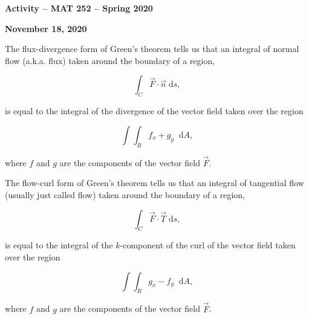 \documentclass{amsart}
\newcommand{\dA}{\;\mbox{d}A}
\begin{document}
\thispagestyle{empty}

\centerline{\Large \bf Activity -- MAT 252 -- Spring 2020}
\bigskip
\centerline{\large \bf November 18, 2020}

\Large


The flux-divergence form of Green's theorem tells us that an integral of 
normal flow (a.k.a. flux) taken around the boundary
of a region,

\[ \int_C \vec{F} \cdot \vec{n} \; \mbox{d}s, \]

is equal to the integral of the divergence of the vector field taken 
over the region

\[ \int\int_R f_x + g_y  \; \dA , \]

\noindent where $f$ and $g$ are the components of the vector field $\vec{F}$.

\vfill

The flow-curl form of Green's theorem tells us that an integral of 
tangential flow (usually just called flow) taken around the boundary
of a region,

\[ \int_C \vec{F} \cdot \vec{T} \; \mbox{d}s, \]

is equal to the integral of the $k$-component of the curl of the vector field taken 
over the region

\[ \int\int_R g_x - f_y  \; \dA , \]

\noindent where $f$ and $g$ are the components of the vector field $\vec{F}$.

\vfill

\newpage
\end{document}
